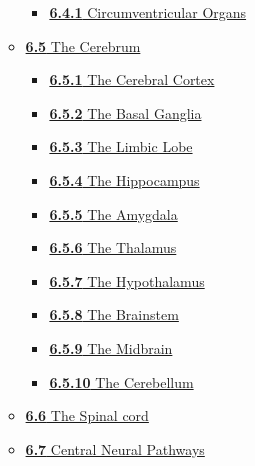 \begin{itemize}
\begin{itemize}
    \begin{itemize}
    \tightlist
    \item
      \href{the-central-nervous-system.html\#circumventricular-organs}{\emph{}\textbf{6.4.1}
      Circumventricular Organs}
    \end{itemize}
  \item
    \href{the-central-nervous-system.html\#the-cerebrum}{\emph{}\textbf{6.5}
    The Cerebrum}

    \begin{itemize}
    \tightlist
    \item
      \href{the-central-nervous-system.html\#the-cerebral-cortex}{\emph{}\textbf{6.5.1}
      The Cerebral Cortex}
    \item
      \href{the-central-nervous-system.html\#the-basal-ganglia}{\emph{}\textbf{6.5.2}
      The Basal Ganglia}
    \item
      \href{the-central-nervous-system.html\#the-limbic-lobe}{\emph{}\textbf{6.5.3}
      The Limbic Lobe}
    \item
      \href{the-central-nervous-system.html\#the-hippocampus}{\emph{}\textbf{6.5.4}
      The Hippocampus}
    \item
      \href{the-central-nervous-system.html\#the-amygdala}{\emph{}\textbf{6.5.5}
      The Amygdala}
    \item
      \href{the-central-nervous-system.html\#the-thalamus}{\emph{}\textbf{6.5.6}
      The Thalamus}
    \item
      \href{the-central-nervous-system.html\#the-hypothalamus}{\emph{}\textbf{6.5.7}
      The Hypothalamus}
    \item
      \href{the-central-nervous-system.html\#the-brainstem}{\emph{}\textbf{6.5.8}
      The Brainstem}
    \item
      \href{the-central-nervous-system.html\#the-midbrain}{\emph{}\textbf{6.5.9}
      The Midbrain}
    \item
      \href{the-central-nervous-system.html\#the-cerebellum}{\emph{}\textbf{6.5.10}
      The Cerebellum}
    \end{itemize}
  \item
    \href{the-central-nervous-system.html\#the-spinal-cord}{\emph{}\textbf{6.6}
    The Spinal cord}
  \item
    \href{the-central-nervous-system.html\#central-neural-pathways}{\emph{}\textbf{6.7}
    Central Neural Pathways}


\end{itemize}
\end{itemize}
